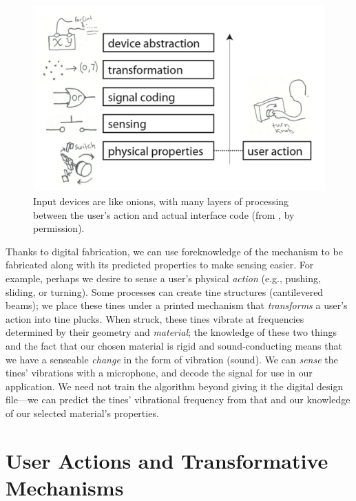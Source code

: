 \begin{figure}
\centering
\includegraphics[width=\textwidth]{figures/onions.png}
\caption{Input devices are like onions, with many layers of processing between the user's action and actual interface code (from \cite{follmer-input}, by permission).} 
\label{fig:onions}
\end{figure}

Thanks to digital fabrication, we can use foreknowledge of the mechanism to be fabricated along with its predicted properties to make sensing easier. For example, perhaps we desire to sense a user's physical \emph{action} (e.g., pushing, sliding, or turning). Some processes can create tine structures (cantilevered beams); we place these tines under a printed mechanism that \emph{transforms} a user's action into tine plucks. When struck, these tines vibrate at frequencies determined by their geometry and \emph{material}; the knowledge of these two things and the fact that our chosen material is rigid and sound-conducting means that we have a senseable \emph{change} in the form of vibration (sound). We can \emph{sense} the tines' vibrations with a microphone, and decode the signal for use in our application. We need not train the algorithm beyond giving it the digital design file---we can predict the tines' vibrational frequency from that and our knowledge of our selected material's properties.

\section{User Actions and Transformative Mechanisms}

